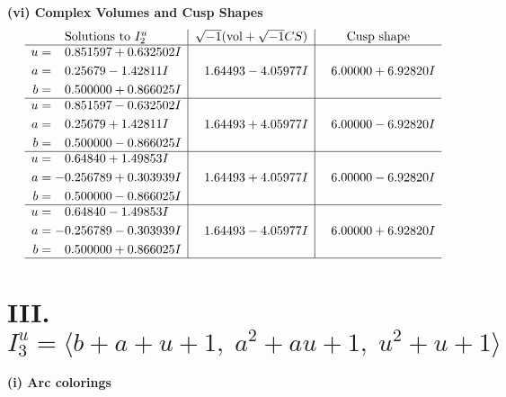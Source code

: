 \documentclass[1p]{elsarticle_modified}
\theoremstyle{definition}
\newcommand{\I}{\sqrt{-1}}
\begin{document}
\newpage\flushleft \textbf{(vi) Complex Volumes and Cusp Shapes}
$$\begin{array}{c|c|c}  
\text{Solutions to }I^u_{2}& \I (\text{vol} + \sqrt{-1}CS) & \text{Cusp shape}\\
 \hline 
\begin{aligned}
u &= \phantom{-}0.851597 + 0.632502 I \\
a &= \phantom{-}0.25679 - 1.42811 I \\
b &= \phantom{-}0.500000 + 0.866025 I\end{aligned}
 & \phantom{-}1.64493 - 4.05977 I & \phantom{-}6.00000 + 6.92820 I \\ \hline\begin{aligned}
u &= \phantom{-}0.851597 - 0.632502 I \\
a &= \phantom{-}0.25679 + 1.42811 I \\
b &= \phantom{-}0.500000 - 0.866025 I\end{aligned}
 & \phantom{-}1.64493 + 4.05977 I & \phantom{-}6.00000 - 6.92820 I \\ \hline\begin{aligned}
u &= \phantom{-}0.64840 + 1.49853 I \\
a &= -0.256789 + 0.303939 I \\
b &= \phantom{-}0.500000 - 0.866025 I\end{aligned}
 & \phantom{-}1.64493 + 4.05977 I & \phantom{-}6.00000 - 6.92820 I \\ \hline\begin{aligned}
u &= \phantom{-}0.64840 - 1.49853 I \\
a &= -0.256789 - 0.303939 I \\
b &= \phantom{-}0.500000 + 0.866025 I\end{aligned}
 & \phantom{-}1.64493 - 4.05977 I & \phantom{-}6.00000 + 6.92820 I\\
 \hline 
 \end{array}$$\newpage\newpage\renewcommand{\arraystretch}{1}
\centering \section*{III. $I^u_{3}= \langle b+a+u+1,\;a^2+a u+1,\;u^2+u+1 \rangle$}
\flushleft \textbf{(i) Arc colorings}\\
\end{document}
